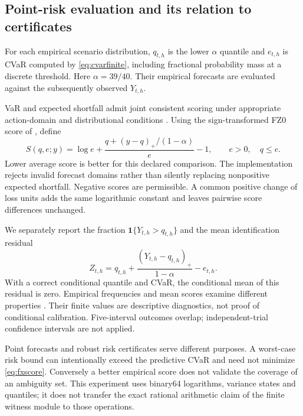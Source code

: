 \documentclass[11pt,a4paper]{article}
\theoremstyle{definition}\newtheorem{definition}[theorem]{Definition}
\begin{document}
\subsection{Point-risk evaluation and its relation to certificates}
For each empirical scenario distribution, $q_{t,h}$ is the lower $\alpha$ quantile and $e_{t,h}$ is CVaR computed by \eqref{eq:cvarfinite}, including fractional probability mass at a discrete threshold. Here $\alpha=39/40$. Their empirical forecasts are evaluated against the subsequently observed $Y_{t,h}$.

VaR and expected shortfall admit joint consistent scoring under appropriate action-domain and distributional conditions \cite{fissler2016elicitability,fissler2021correction}. Using the sign-transformed FZ0 score of \citet{patton2019es}, define
\begin{equation}
 S(q,e;y)=\log e+\frac{q+(y-q)_+/(1-\alpha)}{e}-1,
 \qquad e>0,\quad q\le e.
 \label{eq:fxscore}
\end{equation}
Lower average score is better for this declared comparison. The implementation rejects invalid forecast domains rather than silently replacing nonpositive expected shortfall. Negative scores are permissible. A common positive change of loss units adds the same logarithmic constant and leaves pairwise score differences unchanged.

We separately report the fraction $\mathbf1\{Y_{t,h}>q_{t,h}\}$ and the mean identification residual
\begin{equation}
 Z_{t,h}=q_{t,h}+\frac{(Y_{t,h}-q_{t,h})_+}{1-\alpha}-e_{t,h}.
 \label{eq:fxresidual}
\end{equation}
With a correct conditional quantile and CVaR, the conditional mean of this residual is zero. Empirical frequencies and mean scores examine different properties \cite{holzmann2014information}. Their finite values are descriptive diagnostics, not proof of conditional calibration. Five-interval outcomes overlap; independent-trial confidence intervals are not applied.

Point forecasts and robust risk certificates serve different purposes. A worst-case risk bound can intentionally exceed the predictive CVaR and need not minimize \eqref{eq:fxscore}. Conversely a better empirical score does not validate the coverage of an ambiguity set. This experiment uses binary64 logarithms, variance states and quantiles; it does not transfer the exact rational arithmetic claim of the finite witness module to those operations.
\end{document}
